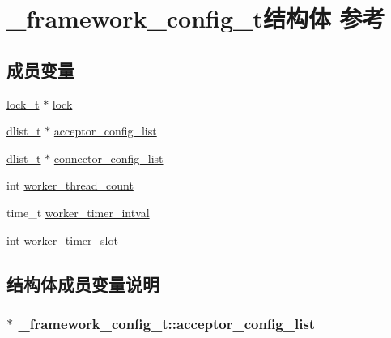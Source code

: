 \hypertarget{a00010}{}\section{\+\_\+framework\+\_\+config\+\_\+t结构体 参考}
\label{a00010}
\subsection*{成员变量}
\begin{DoxyCompactItemize}
\item 
\hyperlink{a00051_ad3e00e0eb0c79dfd77ff2ff833f49c7d_ad3e00e0eb0c79dfd77ff2ff833f49c7d}{lock\+\_\+t} $\ast$ \hyperlink{a00010_a1197caef0f9bf00e7949d401a0f364e6_a1197caef0f9bf00e7949d401a0f364e6}{lock}
\item 
\hyperlink{a00051_ad6644d67df4b4e3596c1eb12977d1d16_ad6644d67df4b4e3596c1eb12977d1d16}{dlist\+\_\+t} $\ast$ \hyperlink{a00010_a95f9d5f585378d4867c80e192b06308d_a95f9d5f585378d4867c80e192b06308d}{acceptor\+\_\+config\+\_\+list}
\item 
\hyperlink{a00051_ad6644d67df4b4e3596c1eb12977d1d16_ad6644d67df4b4e3596c1eb12977d1d16}{dlist\+\_\+t} $\ast$ \hyperlink{a00010_a29ec062032c50405f16ad48fbebb49ec_a29ec062032c50405f16ad48fbebb49ec}{connector\+\_\+config\+\_\+list}
\item 
int \hyperlink{a00010_a9a064afbac56ea11a4ec150bb4df152e_a9a064afbac56ea11a4ec150bb4df152e}{worker\+\_\+thread\+\_\+count}
\item 
time\+\_\+t \hyperlink{a00010_a069819672805007308b35d0553051a15_a069819672805007308b35d0553051a15}{worker\+\_\+timer\+\_\+intval}
\item 
int \hyperlink{a00010_aa1e13d29f85dbf6a0430c43313e2ec79_aa1e13d29f85dbf6a0430c43313e2ec79}{worker\+\_\+timer\+\_\+slot}
\end{DoxyCompactItemize}


\subsection{结构体成员变量说明}
\hypertarget{a00010_a95f9d5f585378d4867c80e192b06308d_a95f9d5f585378d4867c80e192b06308d}{}
\subsubsection[{acceptor\+\_\+config\+\_\+list}]{$\ast$ \+\_\+framework\+\_\+config\+\_\+t\+::acceptor\+\_\+config\+\_\+list}\label{a00010_a95f9d5f585378d4867c80e192b06308d_a95f9d5f585378d4867c80e192b06308d}
\hypertarget{a00010_a29ec062032c50405f16ad48fbebb49ec_a29ec062032c50405f16ad48fbebb49ec}{}
